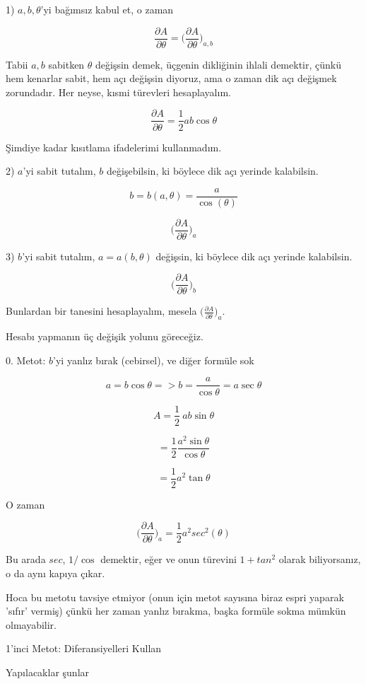 \documentclass[12pt,fleqn]{article}\usepackage{../../common}
\begin{document}
1) $a,b,\theta$'yi bağımsız kabul et, o zaman

$$ \frac{\partial A}{\partial \theta} = 
\bigg( \frac{\partial A}{\partial \theta} \bigg)_{a,b}  $$

Tabii $a,b$ sabitken $\theta$ değişsin demek, üçgenin dikliğinin ihlali
demektir, çünkü hem kenarlar sabit, hem açı değişsin diyoruz, ama o zaman
dik açı değişmek zorundadır. Her neyse, kısmi türevleri hesaplayalım. 

$$ \frac{\partial A}{\partial \theta} = \frac{1}{2}ab \cos\theta $$

Şimdiye kadar kısıtlama ifadelerimi kullanmadım. 

2) $a$'yi sabit tutalım, $b$ değişebilsin, ki böylece dik açı yerinde
kalabilsin. 

$$ b = b(a,\theta) = \frac{a}{\cos(\theta)} $$

$$ \bigg( \frac{\partial A}{\partial \theta} \bigg)_{a}  $$

3) $b$'yi sabit tutalım, $a = a(b,\theta)$ değişsin, ki böylece dik açı yerinde
kalabilsin. 

$$ \bigg( \frac{\partial A}{\partial \theta} \bigg)_{b}  $$

Bunlardan bir tanesini hesaplayalım, mesela $\bigg( \frac{\partial A}{\partial 
\theta} \bigg)_{a} $.

Hesabı yapmanın üç değişik yolunu göreceğiz. 

0. Metot: $b$'yi yanlız bırak (cebirsel), ve diğer formüle sok

$$ a = b \cos \theta => b = \frac{a}{\cos\theta} = a \sec\theta$$

$$ A = \frac{1}{2} \ ab \sin\theta $$

$$ = \frac{1}{2} \frac{a^2 \sin \theta}{\cos \theta} $$

$$ = \frac{1}{2} a^2 \tan \theta $$

O zaman 

$$ \bigg( \frac{\partial A}{\partial \theta} \bigg)_{a} = 
\frac{1}{2}a^2sec^2(\theta)
$$

Bu arada $sec$, $1/\cos$ demektir, eğer ve onun türevini $1+tan^2$ olarak
biliyorsanız, o da aynı kapıya çıkar. 

Hoca bu metotu tavsiye etmiyor (onun için metot sayısına biraz espri yaparak
'sıfır' vermiş) çünkü her zaman yanlız bırakma, başka formüle sokma mümkün
olmayabilir.

1'inci Metot: Diferansiyelleri Kullan

Yapılacaklar şunlar
\end{document}

